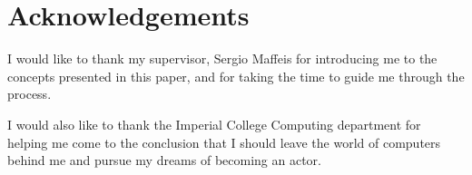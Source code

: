 \section*{Acknowledgements}

I would like to thank my supervisor, Sergio Maffeis for introducing me to the concepts presented in this paper, and for taking the time to guide me through the process. 

I would also like to thank the Imperial College Computing department for helping me come to the conclusion that I should leave the world of computers behind me and pursue my dreams of becoming an actor.
